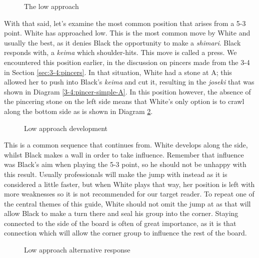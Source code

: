 \documentclass[a5paper,12pt,twoside]{book} %
\newcounter{joseki}                 %
\newcommand{\dref}[1]{Diagram \ref{#1}}
\begin{document}
\begin{figure}[!htbp]
 
\vspace{-0.6cm}\caption{The low approach}
\label{5-3:low-approach}
\end{figure}

With that said, let's examine the most common position that arises from a 5-3 point. White has approached low. This is the most common move by White and usually the best, as it denies Black the opportunity to make a \textit{shimari}. Black responds with{\large\blackstone[2]}, a \textit{keima} which shoulder-hits{\large\whitestone[1]}. This move is called a press. We encountered this position earlier, in the discussion on pincers made from the 3-4 in Section \ref{sec:3-4:pincers}. In that situation, White had a stone at A; this allowed her to push into Black's \textit{keima} and cut it, resulting in the \textit{joseki} that was shown in \dref{3-4:pincer-simple-A}. In this position however, the absence of the pincering stone on the left side means that White's only option is to crawl along the bottom side as is shown in \dref{5-3:low-approach-dev}.\\

\begin{figure}[!htbp]
 
\vspace{-0.6cm}\caption{Low approach development}
\label{5-3:low-approach-dev}
\end{figure}

This is a common sequence that continues from{\large\blackstone[2]}. White develops along the side, whilst Black makes a wall in order to take influence. Remember that influence was Black's aim when playing the 5-3 point, so he should not be unhappy with this result. Usually professionals will make the jump{\large\whitestone[7]} with{\large\whitestone[5]} instead as it is considered a little faster, but when White plays that way, her position is left with more weaknesses so it is not recommended for our target reader. To repeat one of the central themes of this guide, White should not omit the jump at{\large\whitestone[7]} as that will allow Black to make a turn there and seal his group into the corner. Staying connected to the side of the board is often of great importance, as it is that connection which will allow the corner group to influence the rest of the board.\\

\begin{figure}[!htbp]
 
\vspace{-0.6cm}\caption{Low approach alternative response}
\label{5-3:low-approach-2}
\end{figure}
\end{document}
